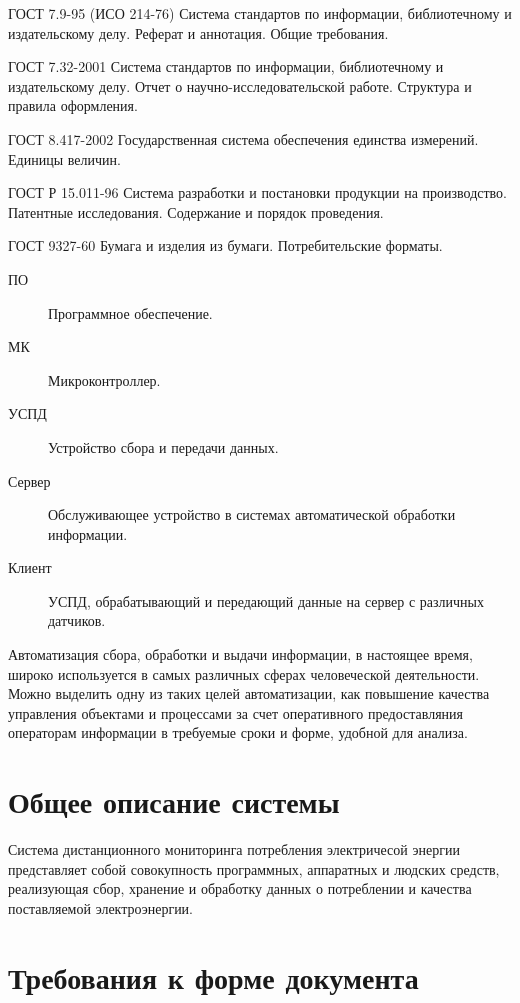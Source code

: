 \documentclass[utf8,14pt, coursreport]{G7-32}
\begin{document}
ГОСТ 7.9-95 (ИСО 214-76) Система стандартов по информации, библиотечному и издательскому делу. Реферат и аннотация. Общие требования.

ГОСТ 7.32-2001 Система стандартов по информации, библиотечному и издательскому делу. Отчет о научно-исследовательской работе. Структура и правила оформления.

ГОСТ 8.417-2002 Государственная система обеспечения единства измерений. Единицы величин.

ГОСТ Р 15.011-96 Система разработки и постановки продукции на производство. Патентные исследования. Содержание и порядок проведения.

ГОСТ 9327-60 Бумага и изделия из бумаги. Потребительские форматы.
\fi


\Abbreviations

\begin{description}
\item[ПО] Программное обеспечение.
\item[МК] Микроконтроллер.
\item[УСПД] Устройство сбора и передачи данных.
\item[Сервер] Обслуживающее устройство в системах автоматической обработки информации.
\item[Клиент] УСПД, обрабатывающий и передающий данные на сервер с различных датчиков.
\end{description}


\Introduction
Автоматизация сбора, обработки и выдачи информации, в настоящее время, широко используется в самых различных сферах человеческой деятельности. Можно выделить одну из таких целей автоматизации, как повышение качества управления объектами и процессами за счет оперативного предоставляния операторам информации в требуемые сроки и форме, удобной для анализа.

\mainmatter %

\chapter{Общее описание системы}


Система дистанционного мониторинга потребления электричесой энергии представляет собой совокупность программных, аппаратных и людских средств, реализующая сбор, хранение и обработку данных о потреблении и качества поставляемой электроэнергии.

\chapter{Требования к форме документа}
\end{document}
